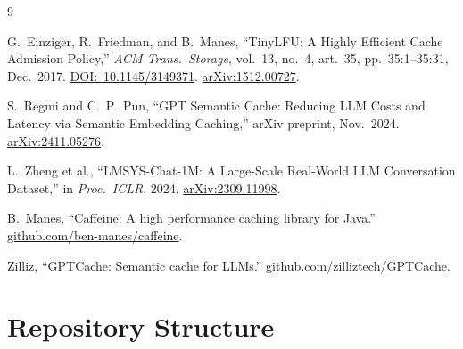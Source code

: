 \documentclass[11pt,a4paper]{article}
\begin{document}
\begin{thebibliography}{9}

 G.~Einziger, R.~Friedman, and B.~Manes, ``TinyLFU: A Highly Efficient Cache Admission Policy,'' \textit{ACM Trans.\ Storage}, vol.~13, no.~4, art.~35, pp.~35:1--35:31, Dec.\ 2017. \href{https://doi.org/10.1145/3149371}{DOI:~10.1145/3149371}. \href{https://arxiv.org/abs/1512.00727}{arXiv:1512.00727}.

 S.~Regmi and C.~P.~Pun, ``GPT Semantic Cache: Reducing LLM Costs and Latency via Semantic Embedding Caching,'' arXiv preprint, Nov.\ 2024. \href{https://arxiv.org/abs/2411.05276}{arXiv:2411.05276}.

 L.~Zheng et al., ``LMSYS-Chat-1M: A Large-Scale Real-World LLM Conversation Dataset,'' in \textit{Proc.\ ICLR}, 2024. \href{https://arxiv.org/abs/2309.11998}{arXiv:2309.11998}.

 B.~Manes, ``Caffeine: A high performance caching library for Java.'' \href{https://github.com/ben-manes/caffeine}{github.com/ben-manes/caffeine}.

 Zilliz, ``GPTCache: Semantic cache for LLMs.'' \href{https://github.com/zilliztech/GPTCache}{github.com/zilliztech/GPTCache}.

\end{thebibliography}

\appendix
\section{Repository Structure}
\end{document}
